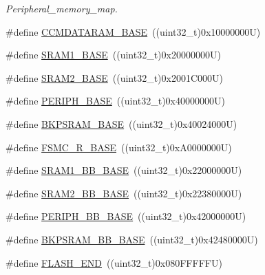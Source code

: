 \begin{DoxyCompactItemize}
\begin{DoxyCompactList}\small\item\em Peripheral\+\_\+memory\+\_\+map. \end{DoxyCompactList}\item 
\#define \hyperlink{group___peripheral__registers__structures_gabea1f1810ebeac402164b42ab54bcdf9}{C\+C\+M\+D\+A\+T\+A\+R\+A\+M\+\_\+\+B\+A\+SE}~((uint32\+\_\+t)0x10000000\+U)
\item 
\#define \hyperlink{group___peripheral__registers__structures_ga7d0fbfb8894012dbbb96754b95e562cd}{S\+R\+A\+M1\+\_\+\+B\+A\+SE}~((uint32\+\_\+t)0x20000000\+U)
\item 
\#define \hyperlink{group___peripheral__registers__structures_gadbb42a3d0a8a90a79d2146e4014241b1}{S\+R\+A\+M2\+\_\+\+B\+A\+SE}~((uint32\+\_\+t)0x2001\+C000\+U)
\item 
\#define \hyperlink{group___peripheral__registers__structures_ga9171f49478fa86d932f89e78e73b88b0}{P\+E\+R\+I\+P\+H\+\_\+\+B\+A\+SE}~((uint32\+\_\+t)0x40000000\+U)
\item 
\#define \hyperlink{group___peripheral__registers__structures_ga52e57051bdf8909222b36e5408a48f32}{B\+K\+P\+S\+R\+A\+M\+\_\+\+B\+A\+SE}~((uint32\+\_\+t)0x40024000\+U)
\item 
\#define \hyperlink{group___peripheral__registers__structures_gaddf0e199dccba83272b20c9fb4d3aaed}{F\+S\+M\+C\+\_\+\+R\+\_\+\+B\+A\+SE}~((uint32\+\_\+t)0x\+A0000000\+U)
\item 
\#define \hyperlink{group___peripheral__registers__structures_gac4c4f61082e4b168f29d9cf97dc3ca5c}{S\+R\+A\+M1\+\_\+\+B\+B\+\_\+\+B\+A\+SE}~((uint32\+\_\+t)0x22000000\+U)
\item 
\#define \hyperlink{group___peripheral__registers__structures_gac33cb6edadf184ab9860d77089503922}{S\+R\+A\+M2\+\_\+\+B\+B\+\_\+\+B\+A\+SE}~((uint32\+\_\+t)0x22380000\+U)
\item 
\#define \hyperlink{group___peripheral__registers__structures_gaed7efc100877000845c236ccdc9e144a}{P\+E\+R\+I\+P\+H\+\_\+\+B\+B\+\_\+\+B\+A\+SE}~((uint32\+\_\+t)0x42000000\+U)
\item 
\#define \hyperlink{group___peripheral__registers__structures_gaee19a30c9fa326bb10b547e4eaf4e250}{B\+K\+P\+S\+R\+A\+M\+\_\+\+B\+B\+\_\+\+B\+A\+SE}~((uint32\+\_\+t)0x42480000\+U)
\item 
\#define \hyperlink{group___peripheral__registers__structures_ga8be554f354e5aa65370f6db63d4f3ee4}{F\+L\+A\+S\+H\+\_\+\+E\+ND}~((uint32\+\_\+t)0x080\+F\+F\+F\+F\+F\+U)
\item 

\end{DoxyCompactItemize}
